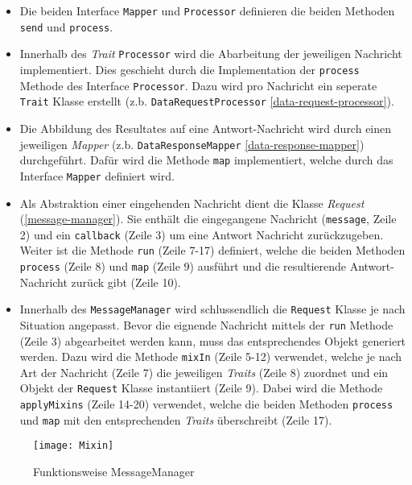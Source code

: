 \begin{itemize}
    \item Die beiden Interface \texttt{Mapper} und \texttt{Processor} definieren die beiden Methoden \texttt{send} und \texttt{process}.
    \item Innerhalb des \textit{Trait} \texttt{Processor} wird die Abarbeitung der jeweiligen Nachricht implementiert. Dies geschieht durch die Implementation der \texttt{process} Methode des Interface \texttt{Processor}. Dazu wird pro Nachricht ein seperate \texttt{Trait} Klasse erstellt (z.b. \texttt{DataRequestProcessor} \autoref{data-request-processor}).
    \item Die Abbildung des Resultates auf eine Antwort-Nachricht wird durch einen jeweiligen \textit{Mapper} (z.b. \texttt{DataResponseMapper} \autoref{data-response-mapper}) durchgeführt. Dafür wird die Methode \texttt{map} implementiert, welche durch das Interface \texttt{Mapper} definiert wird.    
    \item Als Abstraktion einer eingehenden Nachricht dient die Klasse \textit{Request} (\autoref{message-manager}). Sie enthält die eingegangene Nachricht (\texttt{message}, Zeile 2) und ein \texttt{callback} (Zeile 3) um eine Antwort Nachricht zurückzugeben. Weiter ist die Methode \texttt{run} (Zeile 7-17) definiert, welche die beiden Methoden \texttt{process} (Zeile 8) und \texttt{map} (Zeile 9) ausführt und die resultierende Antwort-Nachricht zurück gibt (Zeile 10).
    \item Innerhalb des \texttt{MessageManager} wird schlussendlich die \texttt{Request} Klasse je nach Situation angepasst. Bevor die eignende Nachricht mittels der \texttt{run} Methode (Zeile 3) abgearbeitet werden kann, muss das entsprechendes Objekt generiert werden. Dazu wird die Methode \texttt{mixIn} (Zeile 5-12) verwendet, welche je nach Art der Nachricht (Zeile 7) die jeweiligen \textit{Traits} (Zeile 8) zuordnet und ein Objekt der \texttt{Request} Klasse instantiiert (Zeile 9). Dabei wird die Methode \texttt{applyMixins} (Zeile 14-20) verwendet, welche die beiden Methoden \texttt{process} und \texttt{map} mit den entsprechenden \textit{Traits} überschreibt (Zeile 17).
\end{itemize}

    \begin{figure}[H]
    \centering
    \texttt{[image: Mixin]}
    \caption{Funktionsweise MessageManager}
    \label{fig:mixin}
    \end{figure}
    
